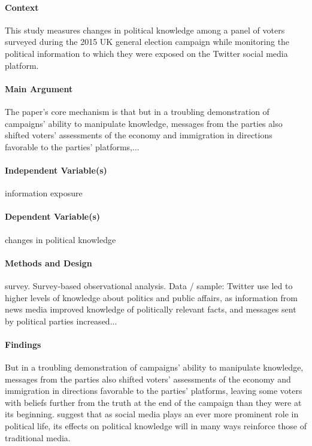 \documentclass[12pt]{article}
\begin{document}
\paragraph{Context} This study measures changes in political knowledge among a panel of voters surveyed during the 2015 UK general election campaign while monitoring the political information to which they were exposed on the Twitter social media platform.

\paragraph{Main Argument} The paper's core mechanism is that but in a troubling demonstration of campaigns' ability to manipulate knowledge, messages from the parties also shifted voters' assessments of the economy and immigration in directions favorable to the parties' platforms,...

\paragraph{Independent Variable(s)} information exposure

\paragraph{Dependent Variable(s)} changes in political knowledge

\paragraph{Methods and Design} survey. Survey-based observational analysis. Data / sample: Twitter use led to higher levels of knowledge about politics and public affairs, as information from news media improved knowledge of politically relevant facts, and messages sent by political parties increased...

\paragraph{Findings} But in a troubling demonstration of campaigns' ability to manipulate knowledge, messages from the parties also shifted voters' assessments of the economy and immigration in directions favorable to the parties' platforms, leaving some voters with beliefs further from the truth at the end of the campaign than they were at its beginning. suggest that as social media plays an ever more prominent role in political life, its effects on political knowledge will in many ways reinforce those of traditional media.
\end{document}
